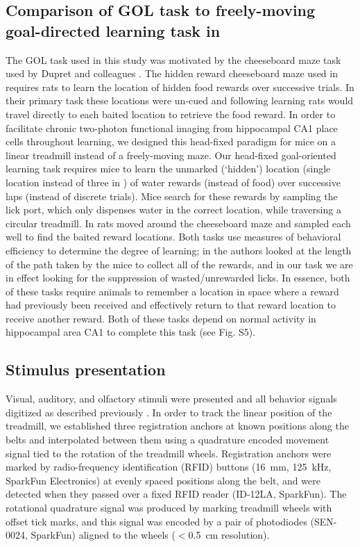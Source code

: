 \subsection{Comparison of GOL task to freely-moving goal-directed learning task in \citeauthor{Dupret2010a}}\label{sec:methods:comp}
The GOL task used in this study was motivated by the cheeseboard maze task used by Dupret and colleagues \citep{Dupret2010a}. The hidden reward cheeseboard maze used in \citeauthor{Dupret2010a} requires rats to learn the location of hidden food rewards over successive trials. In their primary task these locations were un-cued and following learning rats would travel directly to each baited location to retrieve the food reward. In order to facilitate chronic two-photon functional imaging from hippocampal CA1 place cells throughout learning, we designed this head-fixed paradigm for mice on a linear treadmill instead of a freely-moving maze. Our head-fixed goal-oriented learning task requires mice to learn the unmarked (`hidden') location (single location instead of three in \citeauthor{Dupret2010a}) of water rewards (instead of food) over successive laps (instead of discrete trials). Mice search for these rewards by sampling the lick port, which only dispenses water in the correct location, while traversing a circular treadmill. In \citeauthor{Dupret2010a} rats moved around the cheeseboard maze and sampled each well to find the baited reward locations. Both tasks use measures of behavioral efficiency to determine the degree of learning; in \citeauthor{Dupret2010a} the authors looked at the length of the path taken by the mice to collect all of the rewards, and in our task we are in effect looking for the suppression of wasted/unrewarded licks. In essence, both of these tasks require animals to remember a location in space where a reward had previously been received and effectively return to that reward location to receive another reward. Both of these tasks depend on normal activity in hippocampal area CA1 to complete this task (see Fig. S5).

\subsection{Stimulus presentation}
Visual, auditory, and olfactory stimuli were presented and all behavior signals digitized as described previously \citep{Danielson2016b, Kaifosh2013, Lovett-Barron2014}. In order to track the linear position of the treadmill, we established three registration anchors at known positions along the belts and interpolated between them using a quadrature encoded movement signal tied to the rotation of the treadmill wheels. Registration anchors were marked by radio-frequency identification (RFID) buttons (16~mm, 125~kHz, SparkFun Electronics) at evenly spaced positions along the belt, and were detected when they passed over a fixed RFID reader (ID-12LA, SparkFun).  The rotational quadrature signal was produced by marking treadmill wheels with offset tick marks, and this signal was encoded by a pair of photodiodes (SEN-0024, SparkFun) aligned to the wheels ($<$0.5~cm resolution).
